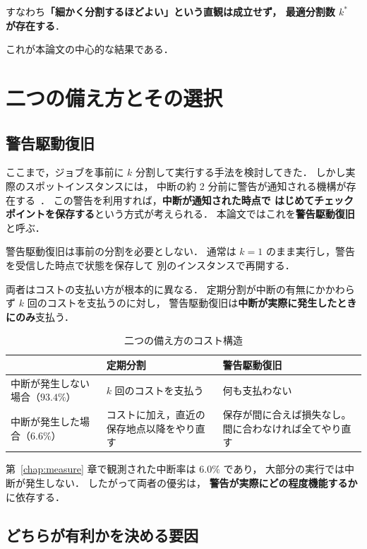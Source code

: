 \documentclass[11pt,a4paper]{ltjsreport}
\begin{document}
すなわち\textbf{「細かく分割するほどよい」という直観は成立せず，
最適分割数 $k^{*}$ が存在する}．

これが本論文の中心的な結果である．

\section{二つの備え方とその選択}
\label{sec:warning}

\subsection{警告駆動復旧}

ここまで，ジョブを事前に $k$ 分割して実行する手法を検討してきた．
しかし実際のスポットインスタンスには，
中断の約 2 分前に警告が通知される機構が存在する~\cite{AWSSpot}．
この警告を利用すれば，\textbf{中断が通知された時点で
はじめてチェックポイントを保存する}という方式が考えられる．
本論文ではこれを\textbf{警告駆動復旧}と呼ぶ．

警告駆動復旧は事前の分割を必要としない．
通常は $k = 1$ のまま実行し，警告を受信した時点で状態を保存して
別のインスタンスで再開する．

両者はコストの支払い方が根本的に異なる．
定期分割が中断の有無にかかわらず $k$ 回のコストを支払うのに対し，
警告駆動復旧は\textbf{中断が実際に発生したときにのみ}支払う．

\begin{table}[htbp]
\centering
\caption{二つの備え方のコスト構造}
\label{tab:two_modes}
\small
\begin{tabularx}{\textwidth}{@{}lXX@{}}
\toprule
 & \textbf{定期分割} & \textbf{警告駆動復旧} \\
\midrule
中断が発生しない場合（$93.4\%$）
  & $k$ 回のコストを支払う
  & 何も支払わない \\
\addlinespace
中断が発生した場合（$6.6\%$）
  & コストに加え，直近の保存地点以降をやり直す
  & 保存が間に合えば損失なし。間に合わなければ全てやり直す \\
\bottomrule
\end{tabularx}
\end{table}

第~\ref{chap:measure} 章で観測された中断率は $6.0\%$ であり，
大部分の実行では中断が発生しない．
したがって両者の優劣は，
\textbf{警告が実際にどの程度機能するか}に依存する．

\subsection{どちらが有利かを決める要因}
\label{sec:which_wins}
\end{document}
